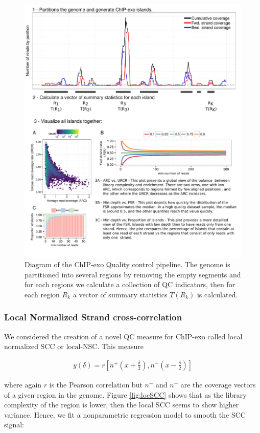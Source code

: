 \documentclass[11pt]{article}\usepackage[]{graphicx}\usepackage[]{color}
\begin{document}
\begin{figure}[H]
  \centering
  \includegraphics[width = .7\textwidth]{../figs/for_paper/coverage_diagram2.pdf}
  \caption{Diagram of the ChIP-exo Quality control pipeline. The
    genome is partitioned into several regions by removing the empty
    segments and for each regions we calculate a collection of QC
    indicators, then for each region $R_k$ a vector of summary
    statistics $T(R_k)$ is calculated.}
  \label{fig:qcdiagram}
\end{figure}

\subsubsection{Local Normalized Strand cross-correlation}
\label{sec:locNSC}

We considered the creation of a novel QC measure for ChIP-exo called
local normalized SCC or $\mbox{local-NSC}$. This measure 

\begin{align}
  y(\delta) = r\left[ n^+ \left(x + \frac{\delta}{2}
    \right), n^- \left( x- \frac{\delta}{2} \right)\right]
\nonumber
\end{align}

where again $r$ is the Pearson correlation but $n^+$ and $n^-$ are the
coverage vectors of a given region in the genome. Figure
\ref{fig:locSCC} shows that as the library complexity of the region is
lower, then the local SCC seems to show higher variance. Hence, we
fit a nonparametric regression model to smooth the SCC signal:
\end{document}
